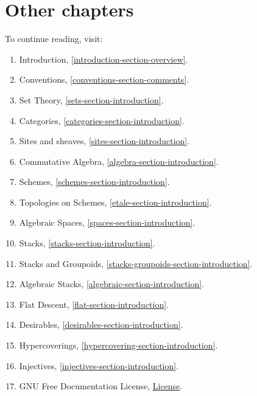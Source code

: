 \section{Other chapters}

\noindent
To continue reading, visit:
\begin{enumerate}
\item Introduction, \autoref{introduction-section-overview}.
\item Conventions, \autoref{conventions-section-comments}.
\item Set Theory, \autoref{sets-section-introduction}.
\item Categories, \autoref{categories-section-introduction}.
\item Sites and sheaves, \autoref{sites-section-introduction}.
\item Commutative Algebra, \autoref{algebra-section-introduction}.
\item Schemes, \autoref{schemes-section-introduction}.
\item Topologies on Schemes, \autoref{etale-section-introduction}.
\item Algebraic Spaces, \autoref{spaces-section-introduction}.
\item Stacks, \autoref{stacks-section-introduction}.
\item Stacks and Groupoids, \autoref{stacks-groupoids-section-introduction}.
\item Algebraic Stacks, \autoref{algebraic-section-introduction}.
\item Flat Descent, \autoref{flat-section-introduction}.
\item Desirables, \autoref{desirables-section-introduction}.
\item Hypercoverings, \autoref{hypercovering-section-introduction}.
\item Injectives, \autoref{injectives-section-introduction}.
\item GNU Free Documentation License, \hyperref[fdl-version]{License}.
\end{enumerate}
